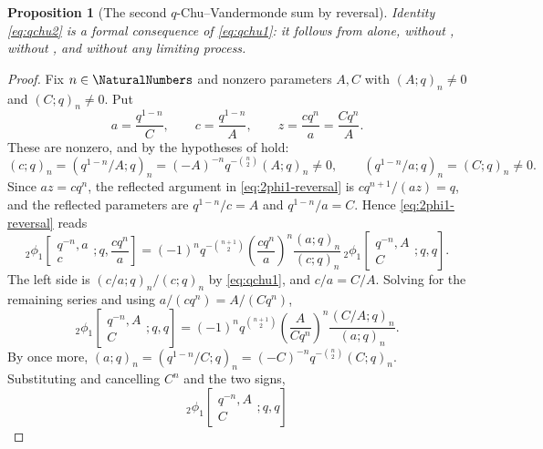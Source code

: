 \documentclass[11pt,a4paper,oneside,openany]{book}
\newtheorem{proposition}[proposition]{Proposition}
\theoremstyle{definition}
\theoremstyle{remark}
\begin{document}
\begin{proposition}[The second $q$-Chu--Vandermonde sum by reversal]\label{prop:qchu2-by-reversal}
Identity \eqref{eq:qchu2} is a formal consequence of \eqref{eq:qchu1}: it follows from  alone, without , without , and without any limiting process.
\end{proposition}

\begin{proof}
Fix $n\in\NaturalNumbers$ and nonzero parameters $A,C$ with $(A;q)_n\ne0$ and $(C;q)_n\ne0$.  Put
\[
 a=\frac{q^{1-n}}{C},\qquad
 c=\frac{q^{1-n}}{A},\qquad
 z=\frac{cq^{n}}{a}=\frac{Cq^{n}}{A}.
\]
These are nonzero, and by  the hypotheses of
 hold:
\[
 (c;q)_n=(q^{1-n}/A;q)_n
 =(-A)^{-n}q^{-\binom n2}(A;q)_n\ne0,
 \qquad
 (q^{1-n}/a;q)_n=(C;q)_n\ne0.
\]
Since $az=cq^{n}$, the reflected argument in \eqref{eq:2phi1-reversal} is
$cq^{n+1}/(az)=q$, and the reflected parameters are $q^{1-n}/c=A$ and
$q^{1-n}/a=C$.  Hence \eqref{eq:2phi1-reversal} reads
\[
 {}_2\phi_1\!\left[
 \begin{matrix}q^{-n},a\\c\end{matrix};q,\frac{cq^n}{a}\right]
 =(-1)^nq^{-\binom{n+1}{2}}
 \left(\frac{cq^{n}}{a}\right)^{n}
 \frac{(a;q)_n}{(c;q)_n}\,
 {}_2\phi_1\!\left[
 \begin{matrix}q^{-n},A\\ C\end{matrix};q,q\right].
\]
The left side is $(c/a;q)_n/(c;q)_n$ by \eqref{eq:qchu1}, and $c/a=C/A$.  Solving for the remaining series and using $a/(cq^{n})=A/(Cq^{n})$,
\[
 {}_2\phi_1\!\left[
 \begin{matrix}q^{-n},A\\ C\end{matrix};q,q\right]
 =(-1)^nq^{\binom{n+1}{2}}
 \left(\frac{A}{Cq^{n}}\right)^{n}
 \frac{(C/A;q)_n}{(a;q)_n}.
\]
By  once more, $(a;q)_n=(q^{1-n}/C;q)_n=(-C)^{-n}q^{-\binom n2}(C;q)_n$.  Substituting and cancelling $C^{n}$ and the two signs,
\[
 {}_2\phi_1\!\left[
 \begin{matrix}q^{-n},A\\ C\end{matrix};q,q\right]
\]
\end{proof}
\end{document}
